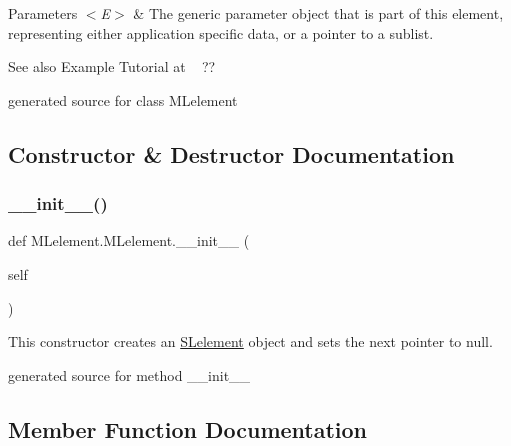 \begin{DoxyParams}{Parameters}
{\em $<$\+E$>$} & The generic parameter object that is part of this element, representing either application specific data, or a pointer to a sublist.\\
\hline
\end{DoxyParams}
\begin{DoxySeeAlso}{See also}
Example Tutorial at ~\newline
 ??\begin{DoxyVerb}generated source for class MLelement \end{DoxyVerb}
 
\end{DoxySeeAlso}


\subsection{Constructor \& Destructor Documentation}
\hypertarget{class_m_lelement_1_1_m_lelement_a766cf6410bcce3cf8f4f9dd6a671c7f5}{}\label{class_m_lelement_1_1_m_lelement_a766cf6410bcce3cf8f4f9dd6a671c7f5} 
\subsubsection{\texorpdfstring{\+\_\+\+\_\+init\+\_\+\+\_\+()}{\_\_init\_\_()}}
{\footnotesize\ttfamily def M\+Lelement.\+M\+Lelement.\+\_\+\+\_\+init\+\_\+\+\_\+ (\begin{DoxyParamCaption}\item[{}]{self }\end{DoxyParamCaption})}



This constructor creates an \hyperlink{namespace_s_lelement}{S\+Lelement} object and sets the next pointer to null. 

\begin{DoxyVerb}generated source for method __init__ \end{DoxyVerb}
 

\subsection{Member Function Documentation}
\hypertarget{class_m_lelement_1_1_m_lelement_a50e032338abeb140c1bc4b108a3070b9}{}\label{class_m_lelement_1_1_m_lelement_a50e032338abeb140c1bc4b108a3070b9} 
